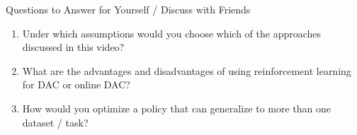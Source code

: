 \begin{frame}[c]{Questions to Answer for Yourself / Discuss with Friends}
    
    \begin{enumerate}
        \item Under which assumptions would you choose which of the approaches discussed in this video?
        \item What are the advantages and disadvantages of using reinforcement learning for DAC or online DAC?
        \item How would you optimize a policy that can generalize to more than one dataset / task?
    \end{enumerate}
    
\end{frame}



